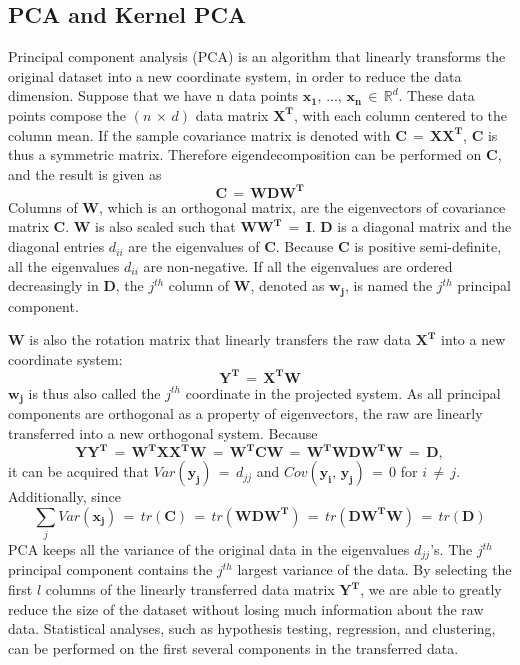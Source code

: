 \documentclass[english]{article}
\numberwithin{equation}{section}
\numberwithin{table}{section}
\numberwithin{figure}{section}
\begin{document}
\subsection{PCA and Kernel PCA} \label{pca}
\hspace{12 pt}
Principal component analysis (PCA) is an algorithm that linearly transforms
the original dataset into a new coordinate system, in order to reduce
the data dimension. Suppose that we have n data points 
$\mathbf{x_{1}},\,...,\,\mathbf{x_{n}}\,\in\,\mathbb{R}^{d}$.
These data points compose the $(n\,\times\, d)$ data matrix $\mathbf{X^{T}}$,
with each column centered to the column mean. If the sample covariance
matrix is denoted with $\mathbf{C}\,=\,\mathbf{XX^{T}}$, $\mathbf{C}$
is thus a symmetric matrix. Therefore eigendecomposition can be performed
on $\mathbf{C}$, and the result is given as
\begin{equation} \label{zz1}
\mathbf{C}\,=\,\mathbf{WDW^{T}}
\end{equation}
Columns of $\mathbf{W}$, which is an orthogonal matrix, are the eigenvectors
of covariance matrix $\mathbf{C}$. $\mathbf{W}$ is also scaled such
that $\mathbf{WW^{T}}\,=\,\mathbf{I}$. $\mathbf{D}$ is a diagonal
matrix and the diagonal entries $d_{ii}$ are the eigenvalues of $\mathbf{C}$.
Because $\mathbf{C}$ is positive semi-definite, all the eigenvalues
$d_{ii}$ are non-negative. If all the eigenvalues are ordered decreasingly
in $\mathbf{D}$, the $j^{th}$ column of $\mathbf{W}$, denoted as
$\mathbf{w_{j}}$, is named the $j^{th}$ principal component.

$\mathbf{W}$ is also the rotation matrix that linearly transfers
the raw data $\mathbf{X^{T}}$ into a new coordinate system:
\begin{equation} \label{zz2}
\mathbf{Y^{T}}\,=\,\mathbf{X^{T}W}
\end{equation}
$\mathbf{w_{j}}$ is thus also called the $j^{th}$ coordinate in
the projected system. As all principal components are orthogonal as
a property of eigenvectors, the raw are linearly transferred into
a new orthogonal system. Because 
\begin{equation} \label{zz3}
\mathbf{YY^{T}\,=\,\mathbf{W^{T}XX^{T}W}\,=\,\mathbf{W^{T}CW}}\,=\,\mathbf{W^{T}WDW^{T}W}\,=\,\mathbf{D},
\end{equation}
it can be acquired that $Var(\mathbf{y_{j}})\,=\, d_{jj}$ and 
$Cov(\mathbf{y_{i}},\,\mathbf{y_{j}})\,=\,0$
for $i\,\neq\, j$. Additionally, since 
\begin{equation} \label{zz4}
\sum_{j}Var(\mathbf{x_{j}})\,=\, tr(\mathbf{C})\,=\, tr(\mathbf{WDW^{T}})\,=\, tr(\mathbf{DW^{T}W})\,=\, tr(\mathbf{D})
\end{equation}
PCA keeps all the variance of the original data in the eigenvalues
$d_{jj}$'s. The $j^{th}$ principal component contains the $j^{th}$
largest variance of the data. By selecting the first $l$ columns
of the linearly transferred data matrix $\mathbf{Y^{T}}$, we are
able to greatly reduce the size of the dataset without losing much
information about the raw data. Statistical analyses, such as hypothesis
testing, regression, and clustering, can be performed on the first
several components in the transferred data.
\end{document}
